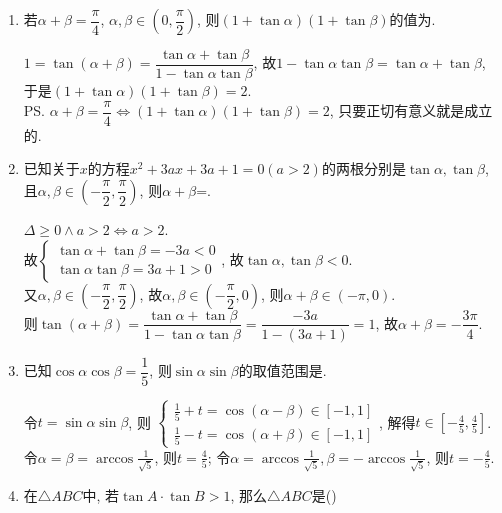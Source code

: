 \begin{enumerate}
\item 若$\alpha+\beta=\dfrac{\pi}{4}$, $\alpha,\beta\in\left(0,\dfrac{\pi}{2}\right)$, 
则$(1+\tan\alpha)(1+\tan\beta)$的值为. 
\begin{jieda}
$1=\tan(\alpha+\beta)=\dfrac{\tan\alpha+\tan\beta}{1-\tan\alpha\tan\beta}$, 故$1-\tan\alpha\tan\beta=\tan\alpha+\tan\beta$, \\
于是$(1+\tan\alpha)(1+\tan\beta)=2$. \\
\ps $\alpha+\beta=\dfrac{\pi}{4}\iff (1+\tan\alpha)(1+\tan\beta)=2$, 只要正切有意义就是成立的. 
\end{jieda}


\item 已知关于$x$的方程$x^2+3ax+3a+1=0(a>2)$的两根分别是$\tan\alpha,\tan\beta$, 且$\alpha,\beta\in\left(-\dfrac{\pi}{2},\dfrac{\pi}{2}\right)$, 
则$\alpha+\beta$=. 
\begin{jieda}
$\Delta\geq 0\land a>2\iff a>2$. \\
故$\begin{cases}
\tan\alpha+\tan\beta=-3a<0\\
\tan\alpha\tan\beta=3a+1>0
\end{cases}$, 
故$\tan\alpha,\tan\beta<0$. \\
又$\alpha,\beta\in\left(-\dfrac{\pi}{2},\dfrac{\pi}{2}\right)$, 故$\alpha,\beta\in\left(-\dfrac{\pi}{2},0\right)$, 则$\alpha+\beta\in(-\pi,0)$. \\
则$\tan(\alpha+\beta)=\dfrac{\tan\alpha+\tan\beta}{1-\tan\alpha\tan\beta}=\dfrac{-3a}{1-(3a+1)}=1$, 故$\alpha+\beta=-\dfrac{3\pi}{4}$. 
\end{jieda}


\item 已知$\cos\alpha\cos\beta=\dfrac{1}{5}$, 则$\sin\alpha\sin\beta$的取值范围是. 
\begin{jieda}
令$t=\sin\alpha\sin\beta$, 则
$\begin{cases}
\frac{1}{5}+t=\cos(\alpha-\beta)\in[-1,1]\\
\frac{1}{5}-t=\cos(\alpha+\beta)\in[-1,1]
\end{cases}$, 
解得$t\in[-\frac{4}{5},\frac{4}{5}]$. \\
令$\alpha=\beta=\arccos\frac{1}{\sqrt{5}}$, 则$t=\frac{4}{5}$; 令$\alpha=\arccos\frac{1}{\sqrt{5}},\beta=-\arccos\frac{1}{\sqrt{5}}$, 则$t=-\frac{4}{5}$. 
\end{jieda}

\item 在$\triangle{ABC}$中, 若$\tan{A}\cdot\tan{B}>1$, 那么$\triangle{ABC}$是\dotfill()


\end{enumerate}
